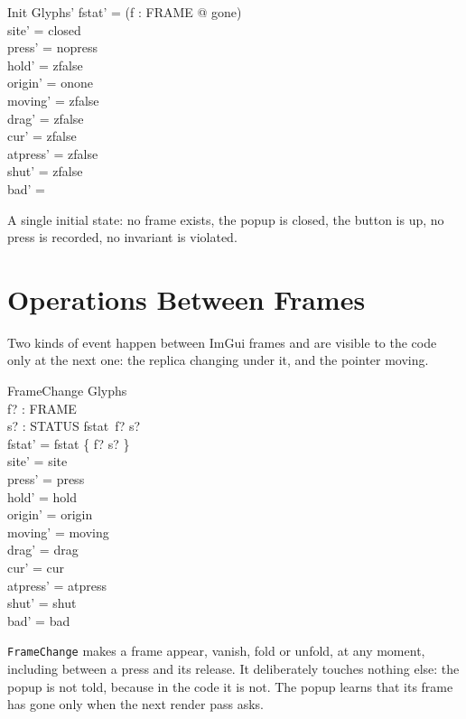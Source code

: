 \documentclass[a4paper,10pt,fleqn]{article}
\begin{document}
\begin{schema}{Init}
  Glyphs'
\where
  fstat' = (\lambda f : FRAME @ gone) \\
  site' = closed \\
  press' = nopress \\
  hold' = zfalse \\
  origin' = onone \\
  moving' = zfalse \\
  drag' = zfalse \\
  cur' = zfalse \\
  atpress' = zfalse \\
  shut' = zfalse \\
  bad' = \emptyset
\end{schema}

A single initial state: no frame exists, the popup is closed, the button is up,
no press is recorded, no invariant is violated.

\section{Operations Between Frames}

Two kinds of event happen between ImGui frames and are visible to the code only
at the next one: the replica changing under it, and the pointer moving.

\begin{schema}{FrameChange}
  \Delta Glyphs \\
  f? : FRAME \\
  s? : STATUS
\where
  fstat~f? \neq s? \\
  fstat' = fstat \oplus \{ f? \mapsto s? \} \\
  site' = site \\
  press' = press \\
  hold' = hold \\
  origin' = origin \\
  moving' = moving \\
  drag' = drag \\
  cur' = cur \\
  atpress' = atpress \\
  shut' = shut \\
  bad' = bad
\end{schema}

\texttt{FrameChange} makes a frame appear, vanish, fold or unfold, at any
moment, including between a press and its release.  It deliberately touches
nothing else: the popup is not told, because in the code it is not.  The popup
learns that its frame has gone only when the next render pass asks.
\end{document}
